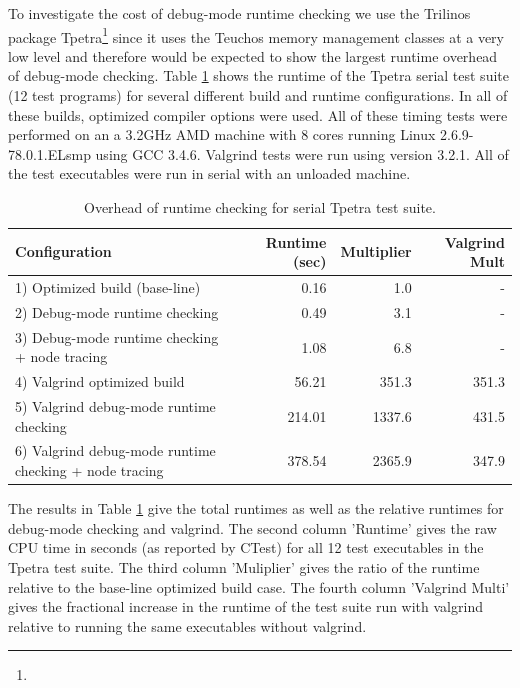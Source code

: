 \documentclass[pdf,ps2pdf,11pt]{SANDreport}
\begin{document}
To investigate the cost of debug-mode runtime checking we use the
Trilinos package
Tpetra\footnote{{}}
since it uses the Teuchos memory management classes at a very low
level and therefore would be expected to show the largest runtime
overhead of debug-mode checking.  Table
{}\ref{tbl:overhead-of-runtime-checking} shows the runtime of the
Tpetra serial test suite (12 test programs) for several different
build and runtime configurations.  In all of these builds, optimized
compiler options were used.  All of these timing tests were performed
on an a 3.2GHz AMD machine with 8 cores running Linux
2.6.9-78.0.1.ELsmp using GCC 3.4.6.  Valgrind tests were run using
version 3.2.1.  All of the test executables were run in serial with an
unloaded machine.

\begin{table}
%
\begin{center}
%
{\small\begin{tabular}{|l|r|r|r|}
\hline
Configuration
& Runtime (sec)
& Multiplier
& Valgrind Mult \\
\hline
\hline
1) Optimized build (base-line)
& 0.16
& 1.0
& - \\
\hline
2) Debug-mode runtime checking
& 0.49
& 3.1
& - \\
\hline
3) Debug-mode runtime checking + node tracing
& 1.08
& 6.8
& - \\
\hline
4) Valgrind optimized build
& 56.21
& 351.3
& 351.3 \\
\hline
5) Valgrind debug-mode runtime checking
& 214.01
& 1337.6
& 431.5 \\
\hline
6) Valgrind debug-mode runtime checking + node tracing
& 378.54
& 2365.9
& 347.9 \\
\hline
\end{tabular}}
%
\end{center}
%
\caption{\label{tbl:overhead-of-runtime-checking}
Overhead of runtime checking for serial Tpetra test suite.}
%
\end{table}

The results in Table {}\ref{tbl:overhead-of-runtime-checking} give the
total runtimes as well as the relative runtimes for debug-mode
checking and valgrind.  The second column 'Runtime' gives the raw CPU
time in seconds (as reported by CTest) for all 12 test executables in
the Tpetra test suite.  The third column 'Muliplier' gives the ratio
of the runtime relative to the base-line optimized build case.  The
fourth column 'Valgrind Multi' gives the fractional increase in the
runtime of the test suite run with valgrind relative to running the
same executables without valgrind.
\end{document}
